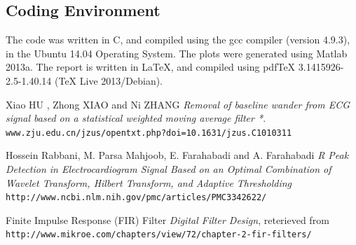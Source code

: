 \documentclass{article}
\begin{document}
\subsection{Coding Environment}
The code was written in C, and compiled using the gcc compiler (version 4.9.3), in the
Ubuntu 14.04 Operating System. The plots were generated using Matlab 2013a. The report 
is written in \LaTeX, and compiled using pdfTeX 3.1415926-2.5-1.40.14 (TeX Live 2013/Debian).

\begin{thebibliography}{9}
Xiao HU , Zhong XIAO and Ni ZHANG 
\textit{Removal of baseline wander from ECG signal based on a statistical weighted moving average filter *}. 
\\\texttt{www.zju.edu.cn/jzus/opentxt.php?doi=10.1631/jzus.C1010311}
 
 Hossein Rabbani, M. Parsa Mahjoob, E. Farahabadi and A. Farahabadi
 \textit{R Peak Detection in Electrocardiogram Signal Based on an Optimal Combination of Wavelet Transform, Hilbert Transform, and Adaptive Thresholding}
 \\\texttt{http://www.ncbi.nlm.nih.gov/pmc/articles/PMC3342622/}

 Finite Impulse Response (FIR) Filter \textit{Digital Filter Design}, reterieved from
 \texttt{http://www.mikroe.com/chapters/view/72/chapter-2-fir-filters/}
 \end{thebibliography}
\end{document}

